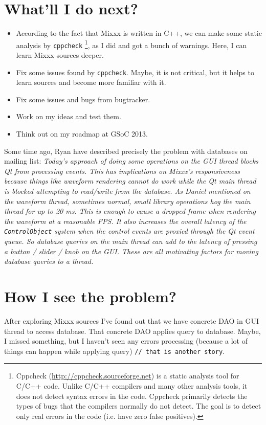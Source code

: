 \documentclass[a4paper,12pt]{scrartcl}
\begin{document}
\section{What'll I do next?}
\begin{itemize}
 \item According to the fact that Mixxx is written in C++, we can make some static analysis by \texttt{cppcheck}%
 \footnote{Cppcheck (\url{http://cppcheck.sourceforge.net}) is a static analysis tool for C/C++ code. Unlike C/C++ compilers and many other analysis tools, it does not detect syntax errors in the code. Cppcheck primarily detects the types of bugs that the compilers normally do not detect. The goal is to detect only real errors in the code (i.e. have zero false positives).},
 as I did and got a bunch of warnings. Here, I can learn Mixxx sources deeper.
 \item Fix some issues found by \texttt{cppcheck}. Maybe, it is not critical, but it helps to learn sources and become more familiar with it.
 \item Fix some issues and bugs from bugtracker.
 \item Work on my ideas and test them.
 \item Think out on my roadmap at GSoC 2013.
\end{itemize}

Some time ago, Ryan have described precisely the problem with databases on mailing list:
\textit{ Today's approach of doing some operations on the GUI thread blocks Qt from processing events. This has implications on Mixxx's responsiveness because things like waveform rendering cannot do work while the Qt main thread is blocked attempting to read/write from the database. As Daniel mentioned on the waveform thread, sometimes normal, small library operations hog the main thread for up to 20 ms. This is enough to cause a dropped frame when rendering the waveform at a reasonable FPS. It also increases the overall latency of the \texttt{ControlObject} system when the control events are proxied through the Qt event queue. So database queries on the main thread can add to the latency of pressing a button / slider / knob on the GUI. These are all motivating factors for moving database queries to a thread.}


\section{How I see the problem?}

After exploring Mixxx sources I've found out that we have concrete DAO in GUI thread to access database. That concrete DAO applies query to database. Maybe, I missed something, but I haven't seen any errors processing (because a lot of things can happen while applying query) \texttt{// that is another story}.
\end{document}
